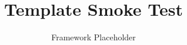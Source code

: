 \documentclass{beamer}
\title{Template Smoke Test}
\author{Framework Placeholder}
\begin{document}
\begin{frame}\titlepage\end{frame}
\end{document}
